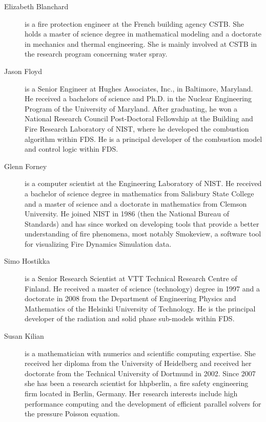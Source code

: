 \begin{description}

\item[Elizabeth Blanchard] is a fire protection engineer at the French building agency CSTB. She holds a master of science degree in mathematical modeling and a doctorate in mechanics and thermal engineering. She is mainly involved at CSTB in the research program concerning water spray.

\item[Jason Floyd] is a Senior Engineer at Hughes Associates, Inc., in Baltimore, Maryland. He received a bachelors of science and Ph.D. in the Nuclear Engineering Program of the University of Maryland. After graduating, he won a National Research Council Post-Doctoral Fellowship at the Building and Fire Research Laboratory of NIST, where he developed the combustion algorithm within FDS. He is a principal developer of the combustion model and control logic within FDS.

\item[Glenn Forney] is a computer scientist at the Engineering Laboratory of NIST.  He received a bachelor of science degree in mathematics from Salisbury State College and a master of science and a doctorate in mathematics from Clemson University.  He joined NIST in 1986 (then the National Bureau of Standards) and has since worked on developing tools that provide a better understanding of fire phenomena, most notably Smokeview, a software tool for visualizing Fire Dynamics Simulation data.

\item[Simo Hostikka] is a Senior Research Scientist at VTT Technical Research Centre of Finland. He received a master of science (technology) degree in 1997 and a doctorate in 2008 from the Department of Engineering Physics and Mathematics of the Helsinki University of Technology.  He is the principal developer of the radiation and solid phase sub-models within FDS.

\item[Susan Kilian] is a mathematician with numerics and scientific computing expertise. She received her diploma from the University of Heidelberg and received her doctorate from the Technical University of Dortmund in 2002. Since 2007 she has been a research scientist for hhpberlin, a fire safety engineering firm located in Berlin, Germany. Her research interests include high performance computing and the development of efficient parallel solvers for the pressure Poisson equation. 


\end{description}
